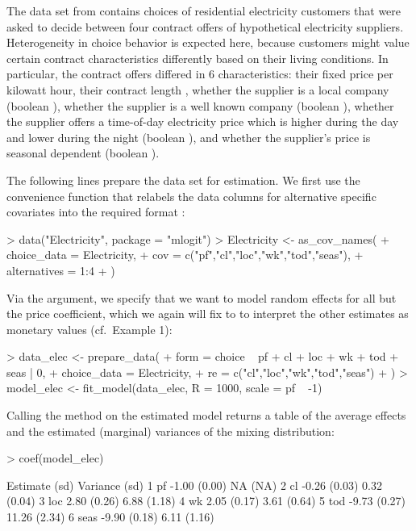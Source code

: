 \documentclass[article,shortnames]{jss}
\newcommand{\fct}[1]{\code{#1()}}
\begin{document}
The  data set from  contains choices of residential electricity customers that were asked to decide between four contract offers of hypothetical electricity suppliers. Heterogeneity in choice behavior is expected here, because customers might value certain contract characteristics differently based on their living conditions. In particular, the contract offers differed in 6 characteristics: their fixed price  per kilowatt hour, their contract length , whether the supplier is a local company (boolean ), whether the supplier is a well known company (boolean ), whether the supplier offers a time-of-day electricity price which is higher during the day and lower during the night (boolean ), and whether the supplier's price is seasonal dependent (boolean ).

The following lines prepare the data set for estimation. We first use the convenience function \fct{as\_cov\_names} that relabels the data columns for alternative specific covariates into the required format :

\begin{Schunk}
\begin{Sinput}
> data("Electricity", package = "mlogit")
> Electricity <- as_cov_names(
+    choice_data = Electricity,
+    cov = c("pf","cl","loc","wk","tod","seas"),
+    alternatives = 1:4
+  )
\end{Sinput}
\end{Schunk}

Via the  argument, we specify that we want to model random effects for all but the price coefficient, which we again will fix to  to interpret the other estimates as monetary values (cf.\ Example 1):

\begin{Schunk}
\begin{Sinput}
> data_elec <- prepare_data(
+    form = choice ~ pf + cl + loc + wk + tod + seas | 0,
+    choice_data = Electricity,
+    re = c("cl","loc","wk","tod","seas")
+  )
> model_elec <- fit_model(data_elec, R = 1000, scale = pf ~ -1)
\end{Sinput}
\end{Schunk}

Calling the \fct{coef} method on the estimated model returns a table of the average effects and the estimated (marginal) variances of the mixing distribution:

\begin{Schunk}
\begin{Sinput}
> coef(model_elec)
\end{Sinput}
\begin{Soutput}
        Estimate   (sd) Variance   (sd)
1   pf     -1.00 (0.00)       NA   (NA)
2   cl     -0.26 (0.03)     0.32 (0.04)
3  loc      2.80 (0.26)     6.88 (1.18)
4   wk      2.05 (0.17)     3.61 (0.64)
5  tod     -9.73 (0.27)    11.26 (2.34)
6 seas     -9.90 (0.18)     6.11 (1.16)
\end{Soutput}
\end{Schunk}
\end{document}
